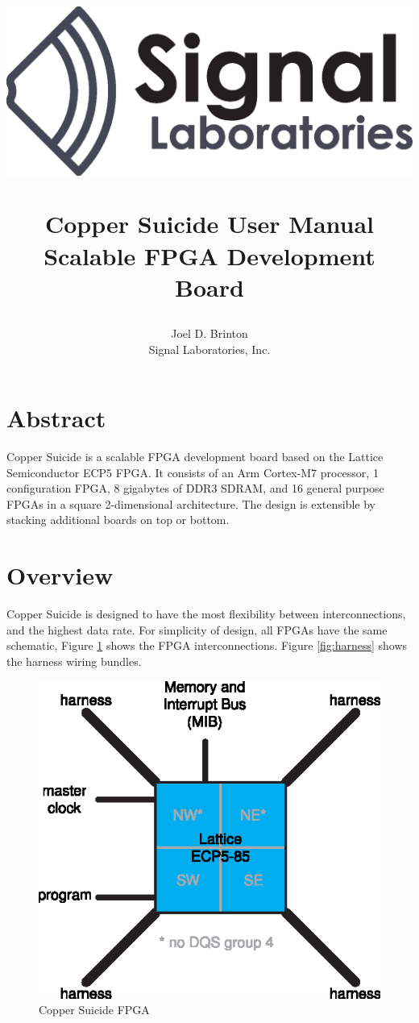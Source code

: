 \documentclass{article}
\title{\begin{center}
\includegraphics[scale=0.5]{logo2-normal-draft.eps}
\end{center}
Copper Suicide\textsuperscript{\texttrademark} User Manual\\
Scalable FPGA Development Board\\
\author{Joel D. Brinton\\Signal Laboratories, Inc.}}
\begin{document}
\maketitle
\section{Abstract}

Copper Suicide is a scalable FPGA development board based on the Lattice Semiconductor ECP5 FPGA. It consists of an Arm Cortex-M7 processor, 1 configuration FPGA, 8 gigabytes of DDR3 SDRAM, and 16 general purpose FPGAs in a square 2-dimensional architecture. The design is extensible by stacking additional boards on top or bottom.

\newpage

\section{Overview}

Copper Suicide is designed to have the most flexibility between interconnections, and the highest data rate. For simplicity of design, all FPGAs have the same schematic, Figure \ref{fig:fpga} shows the FPGA interconnections. Figure \ref{fig:harness} shows the harness wiring bundles.

\begin{figure}[H]
  \centering
  \includegraphics[scale=1]{cs_fpga.eps}
	\caption{Copper Suicide FPGA}
	\label{fig:fpga}
\end{figure}
\end{document}
